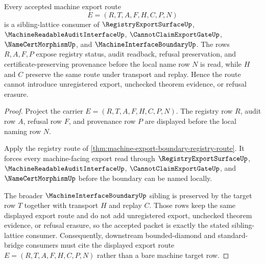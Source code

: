 \begin{theorem}
\label{thm:machine-export-boundary-sibling-route}
Every accepted machine export route
$$
E=(R,T,A,F,H,C,P,N)
$$
is a sibling-lattice consumer of $\RegistryExportSurfaceUp$, $\MachineReadableAuditInterfaceUp$, $\CannotClaimExportGateUp$, $\NameCertMorphismUp$, and $\MachineInterfaceBoundaryUp$. The rows $R,A,F,P$ expose registry status, audit readback, refusal preservation, and certificate-preserving provenance before the local name row $N$ is read, while $H$ and $C$ preserve the same route under transport and replay. Hence the route cannot introduce unregistered export, unchecked theorem evidence, or refusal erasure.
\end{theorem}
\begin{proof}
Project the carrier $E=(R,T,A,F,H,C,P,N)$. The registry row $R$, audit row $A$, refusal row $F$, and provenance row $P$ are displayed before the local naming row $N$.

Apply the registry route of \autoref{thm:machine-export-boundary-registry-route}. It forces every machine-facing export read through $\RegistryExportSurfaceUp$, $\MachineReadableAuditInterfaceUp$, $\CannotClaimExportGateUp$, and $\NameCertMorphismUp$ before the boundary can be named locally.

The broader $\MachineInterfaceBoundaryUp$ sibling is preserved by the target row $T$ together with transport $H$ and replay $C$. Those rows keep the same displayed export route and do not add unregistered export, unchecked theorem evidence, or refusal erasure, so the accepted packet is exactly the stated sibling-lattice consumer. Consequently, downstream bounded-diamond and standard-bridge consumers must cite the displayed export route $E=(R,T,A,F,H,C,P,N)$ rather than a bare machine target row.
\end{proof}

